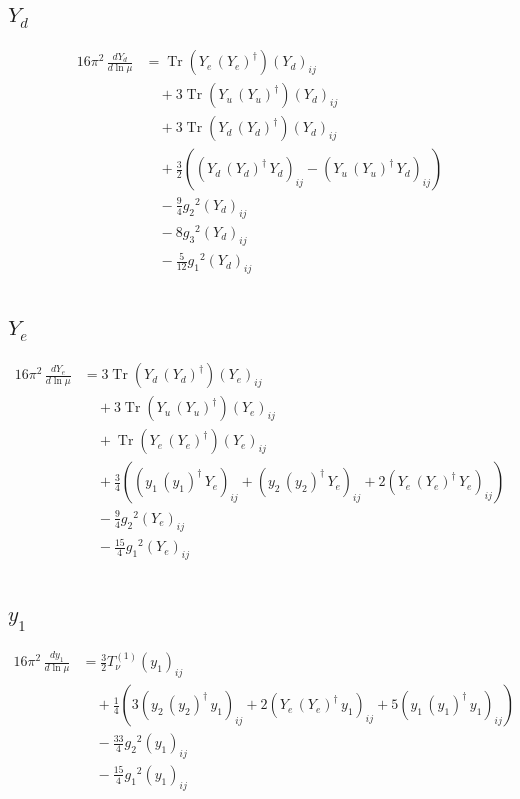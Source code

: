 \documentclass[10pt,a4paper]{article}
\begin{document}
\subsection*{$Y_d$}
\begin{align*}
16\pi^2\,\frac{d Y_d}{d\ln\mu} &=\operatorname{Tr}\!\left({Y_e}\,\left({Y_e}\right)^{\dagger}\right) \left({Y_d}\right)_{ij} \\
&\quad +3 \operatorname{Tr}\!\left({Y_u}\,\left({Y_u}\right)^{\dagger}\right) \left({Y_d}\right)_{ij} \\
&\quad +3 \operatorname{Tr}\!\left({Y_d}\,\left({Y_d}\right)^{\dagger}\right) \left({Y_d}\right)_{ij} \\
&\quad +\frac{3}{2} (\left({Y_d}\,\left({Y_d}\right)^{\dagger}\,{Y_d}\right)_{ij}-\left({Y_u}\,\left({Y_u}\right)^{\dagger}\,{Y_d}\right)_{ij}) \\
&\quad -\frac{9}{4} {g_2}^2 \left({Y_d}\right)_{ij} \\
&\quad -8 {g_3}^2 \left({Y_d}\right)_{ij} \\
&\quad -\frac{5}{12} {g_1}^2 \left({Y_d}\right)_{ij} \\
\end{align*}
\subsection*{$Y_e$}
\begin{align*}
16\pi^2\,\frac{d Y_e}{d\ln\mu} &=3 \operatorname{Tr}\!\left({Y_d}\,\left({Y_d}\right)^{\dagger}\right) \left({Y_e}\right)_{ij} \\
&\quad +3 \operatorname{Tr}\!\left({Y_u}\,\left({Y_u}\right)^{\dagger}\right) \left({Y_e}\right)_{ij} \\
&\quad +\operatorname{Tr}\!\left({Y_e}\,\left({Y_e}\right)^{\dagger}\right) \left({Y_e}\right)_{ij} \\
&\quad +\frac{3}{4} (\left({y_1}\,\left({y_1}\right)^{\dagger}\,{Y_e}\right)_{ij}+\left({y_2}\,\left({y_2}\right)^{\dagger}\,{Y_e}\right)_{ij}+2 \left({Y_e}\,\left({Y_e}\right)^{\dagger}\,{Y_e}\right)_{ij}) \\
&\quad -\frac{9}{4} {g_2}^2 \left({Y_e}\right)_{ij} \\
&\quad -\frac{15}{4} {g_1}^2 \left({Y_e}\right)_{ij} \\
\end{align*}
\subsection*{$y_1$}
\begin{align*}
16\pi^2\,\frac{d y_1}{d\ln\mu} &=\frac{3}{2} T_{\nu}^{(1)} \left({y_1}\right)_{ij} \\
&\quad +\frac{1}{4} (3 \left({y_2}\,\left({y_2}\right)^{\dagger}\,{y_1}\right)_{ij}+2 \left({Y_e}\,\left({Y_e}\right)^{\dagger}\,{y_1}\right)_{ij}+5 \left({y_1}\,\left({y_1}\right)^{\dagger}\,{y_1}\right)_{ij}) \\
&\quad -\frac{33}{4} {g_2}^2 \left({y_1}\right)_{ij} \\
&\quad -\frac{15}{4} {g_1}^2 \left({y_1}\right)_{ij} \\
\end{align*}
\end{document}
